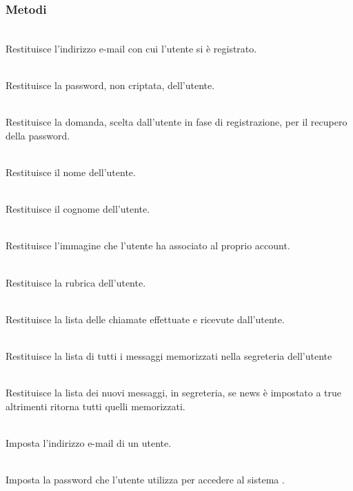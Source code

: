 \subsubsection*{Metodi}
\begin{description}
	\item{}\\
Restituisce l'indirizzo e-mail con cui l'utente si è registrato.
	\item{}\\
Restituisce la password, non criptata, dell'utente.
	\item{}\\
Restituisce la domanda, scelta dall'utente in fase di registrazione, per il recupero della password.
	\item{}\\
Restituisce il nome dell'utente.
	\item{}\\
Restituisce il cognome dell'utente.
	\item{}\\
Restituisce l'immagine che l'utente ha associato al proprio account.
	\item{}\\
Restituisce la rubrica dell'utente.
	\item{}\\
Restituisce la lista delle chiamate effettuate e ricevute dall'utente.
	\item{}\\
Restituisce la lista di tutti i messaggi memorizzati nella segreteria dell'utente
	\item{}\\
Restituisce la lista dei nuovi messaggi, in segreteria, se news è impostato a true altrimenti ritorna tutti quelli memorizzati.
	\item{}\\
Imposta l'indirizzo e-mail di un utente.
	\item{}\\
Imposta la password che l'utente utilizza per accedere al sistema \caName.
	\item{}\\

\end{description}
